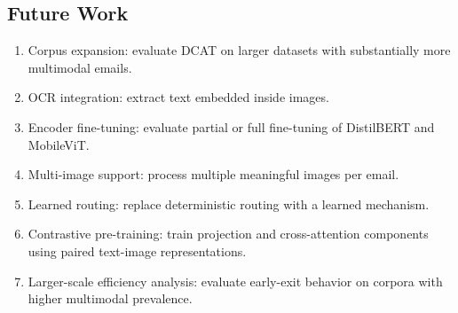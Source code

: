 \documentclass[conference]{IEEEtran}
\begin{document}
\subsection{Future Work}
\begin{enumerate}
\item Corpus expansion: evaluate DCAT on larger datasets with substantially more multimodal emails.
\item OCR integration: extract text embedded inside images.
\item Encoder fine-tuning: evaluate partial or full fine-tuning of DistilBERT and MobileViT.
\item Multi-image support: process multiple meaningful images per email.
\item Learned routing: replace deterministic routing with a learned mechanism.
\item Contrastive pre-training: train projection and cross-attention components using paired text-image representations.
\item Larger-scale efficiency analysis: evaluate early-exit behavior on corpora with higher multimodal prevalence.
\end{enumerate}

\balance


\end{document}
